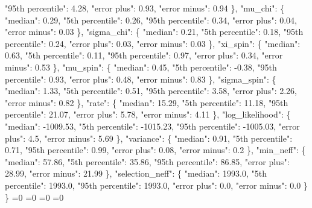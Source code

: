 {{        "95th percentile": 4.28, %
        "error plus": 0.93, %
        "error minus": 0.94%
      \}, %
      "mu\_chi": \{%
        "median": 0.29, %
        "5th percentile": 0.26, %
        "95th percentile": 0.34, %
        "error plus": 0.04, %
        "error minus": 0.03%
      \}, %
      "sigma\_chi": \{%
        "median": 0.21, %
        "5th percentile": 0.18, %
        "95th percentile": 0.24, %
        "error plus": 0.03, %
        "error minus": 0.03%
      \}, %
      "xi\_spin": \{%
        "median": 0.63, %
        "5th percentile": 0.11, %
        "95th percentile": 0.97, %
        "error plus": 0.34, %
        "error minus": 0.53%
      \}, %
      "mu\_spin": \{%
        "median": 0.45, %
        "5th percentile": {-}0.38, %
        "95th percentile": 0.93, %
        "error plus": 0.48, %
        "error minus": 0.83%
      \}, %
      "sigma\_spin": \{%
        "median": 1.33, %
        "5th percentile": 0.51, %
        "95th percentile": 3.58, %
        "error plus": 2.26, %
        "error minus": 0.82%
      \}, %
      "rate": \{%
        "median": 15.29, %
        "5th percentile": 11.18, %
        "95th percentile": 21.07, %
        "error plus": 5.78, %
        "error minus": 4.11%
      \}, %
      "log\_likelihood": \{%
        "median": {-}1009.53, %
        "5th percentile": {-}1015.23, %
        "95th percentile": {-}1005.03, %
        "error plus": 4.5, %
        "error minus": 5.69%
      \}, %
      "variance": \{%
        "median": 0.91, %
        "5th percentile": 0.71, %
        "95th percentile": 0.99, %
        "error plus": 0.08, %
        "error minus": 0.2%
      \}, %
      "min\_neff": \{%
        "median": 57.86, %
        "5th percentile": 35.86, %
        "95th percentile": 86.85, %
        "error plus": 28.99, %
        "error minus": 21.99%
      \}, %
      "selection\_neff": \{%
        "median": 1993.0, %
        "5th percentile": 1993.0, %
        "95th percentile": 1993.0, %
        "error plus": 0.0, %
        "error minus": 0.0%
      \}%
    \}}%
  \else%
    \ifnum{}=0%
      \let\MagBetaUnconstrainedIidTiltIsotropicTruncnormNid@I@out\MagBetaUnconstrainedIidTiltIsotropicTruncnormNid@III%
    \else%
      \ifnum{}=0%
      \let\MagBetaUnconstrainedIidTiltIsotropicTruncnormNid@I@out\MagBetaUnconstrainedIidTiltIsotropicTruncnormNid@IV%
    \else%
      \ifnum{}=0%
      \let\MagBetaUnconstrainedIidTiltIsotropicTruncnormNid@I@out\MagBetaUnconstrainedIidTiltIsotropicTruncnormNid@V%
    \else%
      \ifnum{}=0%
      \let\MagBetaUnconstrainedIidTiltIsotropicTruncnormNid@I@out\MagBetaUnconstrainedIidTiltIsotropicTruncnormNid@VI%
}
